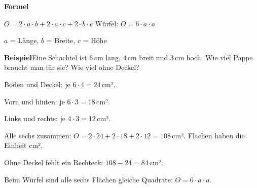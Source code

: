 \documentclass[11pt]{article}
\begin{document}
\noindent\textbf{Formel}\par\nopagebreak\noindent\hspace*{4mm}\begin{minipage}{\dimexpr\linewidth-4mm\relax}$O = 2 \cdot a \cdot b + 2 \cdot a \cdot c + 2 \cdot b \cdot c$ \qquad Würfel: $O = 6 \cdot a \cdot a$\par $a$ = Länge, $b$ = Breite, $c$ = Höhe\end{minipage}\par\medskip
\noindent\textbf{Beispiel}\quad Eine Schachtel ist $6$\,cm lang, $4$\,cm breit und $3$\,cm hoch. Wie viel Pappe braucht man für sie? Wie viel ohne Deckel?\par\smallskip
\noindent\begin{minipage}[t]{0.6\linewidth}\vspace{0pt}\par\noindent{}Boden und Deckel: je $6 \cdot 4 = 24$\,cm².\par\smallskip\par\noindent{}Vorn und hinten: je $6 \cdot 3 = 18$\,cm².\par\smallskip\par\noindent{}Links und rechts: je $4 \cdot 3 = 12$\,cm².\par\smallskip\par\noindent{}Alle sechs zusammen: $O = 2 \cdot 24 + 2 \cdot 18 + 2 \cdot 12 = 108$\,cm². Flächen haben die Einheit cm².\par\smallskip\par\noindent{}Ohne Deckel fehlt ein Rechteck: $108 - 24 = 84$\,cm².\par\smallskip\par\noindent{}Beim Würfel sind alle sechs Flächen gleiche Quadrate: $O = 6 \cdot a \cdot a$.\par\smallskip\end{minipage}\hfill
\begin{minipage}[t]{0.37\linewidth}\vspace{0pt}\centering {}\end{minipage}\par\medskip
\end{document}
